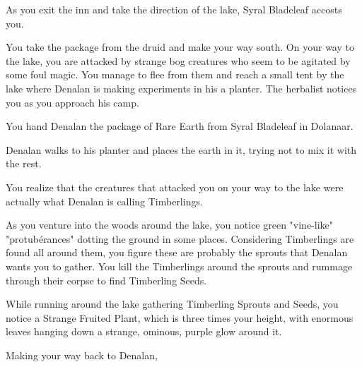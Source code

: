 As you exit the inn and take the direction of the lake, Syral Bladeleaf accosts you.


You take the package from the druid and make your way south. On your way to the lake, you are attacked by strange bog creatures who seem to be agitated by some foul magic. You manage to flee from them and reach a small tent by the lake where Denalan is making experiments in his a planter. The herbalist notices you as you approach his camp.


You hand Denalan the package of Rare Earth from Syral Bladeleaf in Dolanaar.



Denalan walks to his planter and places the earth in it, trying not to mix it with the rest.





You realize that the creatures that attacked you on your way to the lake were actually what Denalan is calling Timberlings.


As you venture into the woods around the lake, you notice green "vine-like" "protubérances" dotting the ground in some places. Considering Timberlings are found all around them, you figure these are probably the sprouts that Denalan wants you to gather. You kill the Timberlings around the sprouts and rummage through their corpse to find Timberling Seeds.

While running around the lake gathering Timberling Sprouts and Seeds, you notice a Strange Fruited Plant, which is three times your height, with enormous leaves hanging down a strange, ominous, purple glow around it.


Making your way back to Denalan,


